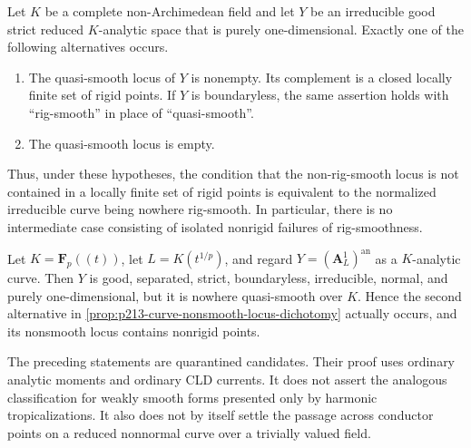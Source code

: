 \begin{proposition}
\label{prop:p213-curve-nonsmooth-locus-dichotomy}
Let $K$ be a complete non-Archimedean field and let $Y$ be an irreducible
good strict reduced $K$-analytic space that is purely one-dimensional.
Exactly one of the following alternatives occurs.
\begin{enumerate}
\item The quasi-smooth locus of $Y$ is nonempty.  Its complement is a
closed locally finite set of rigid points.  If $Y$ is boundaryless, the
same assertion holds with ``rig-smooth'' in place of ``quasi-smooth''.
\item The quasi-smooth locus is empty.
\end{enumerate}
Thus, under these hypotheses, the condition that the non-rig-smooth locus
is not contained in a locally finite set of rigid points is equivalent to
the normalized irreducible curve being nowhere rig-smooth.  In
particular, there is no intermediate case consisting of isolated
nonrigid failures of rig-smoothness.
\end{proposition}

\begin{example}
\label{ex:p213-nowhere-smooth-normal-curve}
Let $K=\mathbf F_p((t))$, let $L=K(t^{1/p})$, and regard
$Y=(\mathbf A^1_L)^{\mathrm{an}}$ as a $K$-analytic curve.  Then $Y$ is
good, separated, strict, boundaryless, irreducible, normal, and purely
one-dimensional, but it is nowhere quasi-smooth over $K$.  Hence the
second alternative in
\cref{prop:p213-curve-nonsmooth-locus-dichotomy} actually occurs, and its
nonsmooth locus contains nonrigid points.
\end{example}

\begin{remark}
\label{rem:p213-variation-graph-quarantine-scope}
The preceding statements are quarantined candidates.  Their proof uses
ordinary analytic moments and ordinary CLD currents.  It does not assert
the analogous classification for weakly smooth forms presented only by
harmonic tropicalizations.  It also does not by itself settle the passage
across conductor points on a reduced nonnormal curve over a trivially
valued field.
\end{remark}
